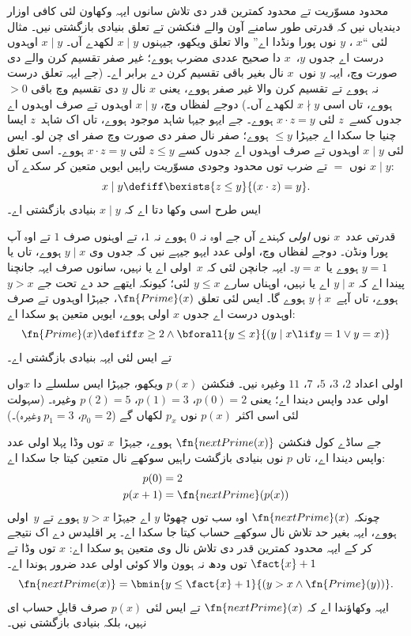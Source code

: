 \documentclass[../../../include/open-logic-section]{subfiles}
\begin{document}

محدود مسوّریت تے محدود کمترین قدر دی تلاش سانوں ایہہ وکھاون
لئی کافی اوزار دیندیاں نیں کہ قدرتی طور سامنے آون والے
فنکشن تے تعلق بنیادی بازگشتی نیں۔ مثال لئی ``$x$
، $y$ نوں پورا ونڈدا اے'' والا تعلق ویکھو، جیہنوں
$x \mid y$ لکھدے آں۔ $x \mid y$ اوہدوں درست اے
جدوں $y$،~$x$ دا صحیح عددی مضرب ہووے؛ غیر صفر
تقسیم کرن والے دی صورت وچ، ایہہ $y$ نوں~$x$ نال
بغیر باقی تقسیم کرن دے برابر اے۔ (جے ایہہ تعلق درست
نہ ہووے تے تقسیم کرن والا غیر صفر ہووے، یعنی $x$
نال $y$ دی تقسیم وچ باقی $> 0$ ہووے، تاں اسی
$x \nmid y$ لکھدے آں۔) دوجے لفظاں وچ، $x \mid y$
اوہدوں تے صرف اوہدوں اے جدوں کسے~$z$ لئی
$x \cdot z = y$ ہووے۔ جے ایہو جیہا شاہد موجود ہووے،
تاں اک شاہد~$z$ ایسا چنیا جا سکدا اے جیہڑا
$\leq y$ ہووے؛ صفر نال صفر دی صورت وچ صفر ای
چن لو۔ ایس لئی $x \mid y$ اوہدوں تے صرف اوہدوں
اے جدوں کسے $z \le y$ لئی $x \cdot z = y$
ہووے۔ اسی تعلق $x \mid y$ نوں $=$ تے ضرب توں
محدود وجودی مسوّریت راہیں ایویں متعین کر سکدے آں:
\[
x \mid y \defiff \bexists{z \leq y}{(x \cdot z) = y}.
\]
ایس طرح اسی وکھا دتا اے کہ $x \mid y$ بنیادی
بازگشتی اے۔

قدرتی عدد~$x$ نوں \emph{اولی} کہندے آں جے اوہ
نہ $0$ ہووے نہ $1$، تے اوہنوں صرف $1$ تے اوہ
آپ پورا ونڈن۔ دوجے لفظاں وچ، اولی عدد ایہو جیہے
نیں کہ جدوں وی $y \mid x$ ہووے، تاں یا $y = 1$
ہووے یا~$y=x$۔ ایہہ جانچن لئی کہ $x$~اولی اے
یا نہیں، سانوں صرف ایہہ جانچنا پیندا اے کہ
$y \mid x$ اے یا نہیں، اوہناں سارے $y \le x$
لئی؛ کیونکہ ایتھے حد
دے تحت جے $y > x$ ہووے، تاں آپے~$y \nmid x$
ہووے گا۔ ایس لئی تعلق $\fn{Prime}(x)$، جیہڑا
اوہدوں تے صرف اوہدوں درست اے جدوں $x$ اولی ہووے،
ایویں متعین ہو سکدا اے:
\[
\fn{Prime}(x) \defiff x \geq 2 \land \bforall{y \leq x}{(y \mid x \lif y
  = 1 \lor y = x)}
\]
تے ایس لئی ایہہ بنیادی بازگشتی اے۔

اولی اعداد $2$، $3$، $5$، $7$، $11$ وغیرہ نیں۔
فنکشن $p(x)$ ویکھو، جیہڑا ایس سلسلے دا $x$واں
اولی عدد واپس دیندا اے؛ یعنی $p(0) =
2$، $p(1) = 3$، $p(2) = 5$ وغیرہ۔ (سہولت
لئی اسی اکثر $p(x)$ نوں $p_x$ لکھاں گے
($p_0=2$، $p_1=3$ وغیرہ)۔)

جے ساڈے کول فنکشن
$\fn{nextPrime(x)}$ ہووے، جیہڑا~$x$ توں وڈا
پہلا اولی عدد واپس دیندا اے، تاں $p$ نوں بنیادی
بازگشت راہیں سوکھے نال متعین کیتا جا سکدا اے:
\begin{align*}
  p(0) & = 2\\
  p(x+1) & = \fn{nextPrime}(p(x))
\end{align*}
چونکہ $\fn{nextPrime}(x)$ اوہ سب توں چھوٹا
$y$ اے جیہڑا $y > x$ ہووے تے $y$~اولی ہووے،
ایہہ بغیر حد تلاش نال سوکھے حساب کیتا جا سکدا اے۔
پر اقلیدس دے اک نتیجے کر کے ایہہ محدود کمترین
قدر دی تلاش نال وی متعین ہو سکدا اے: $x$ توں
وڈا تے $\fact{x}+1$ توں ودھ نہ ہوون والا کوئی
اولی عدد ضرور ہوندا اے۔
\[
  \fn{nextPrime(x)} =
  \bmin{y \leq \fact{x}+1}{(y > x \land \fn{Prime}(y))}.
\]
ایہہ وکھاؤندا اے کہ $\fn{nextPrime}(x)$ تے ایس
لئی $p(x)$ صرف قابلِ حساب ای نہیں، بلکہ بنیادی
بازگشتی نیں۔
\end{document}
